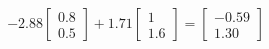 \documentclass[preview]{standalone}
\begin{document}
\begin{align*}
-2.88 \begin{bmatrix} 0.8 \\ 0.5 \end{bmatrix} + 1.71 \begin{bmatrix} 1 \\ 1.6 \end{bmatrix} = \begin{bmatrix} -0.59 \\ 1.30 \end{bmatrix}
\end{align*}
\end{document}
